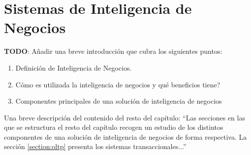 \chapter{Sistemas de Inteligencia de Negocios}\label{chapter:bi-systems}

\textbf{TODO}: A\~nadir una breve introducci\'on que cubra los siguientes puntos:
\begin{enumerate}
    \item Definici\'on de Inteligencia de Negocios.
    \item C\'omo es utilizada la inteligencia de negocios y qu\'e beneficios tiene?
    \item Componentes principales de una soluci\'on de inteligencia de negocios
\end{enumerate}
Una breve descripci\'on del contenido del resto del cap\'itulo:
``Las secciones en las que se estructura el resto del cap\'itulo recogen un estudio de los distintos componentes de una soluci\'on
de inteligencia de negocios de forma respectiva. La secci\'on \ref{section:oltp} presenta los sistemas transaccionales...''







